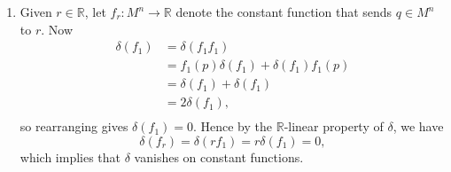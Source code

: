 \documentclass{article}
\begin{document}
\begin{enumerate}[label={\bf Q\arabic*:}]
\begin{enumerate}
      \item Given $r\in\mathbb{R}$, let $f_r:M^n\rightarrow\mathbb{R}$
        denote the constant function that sends $q\in M^n$ to $r$. Now
        \begin{align*}
          \delta(f_1) &=\delta(f_1f_1) \\
            &=f_1(p)\delta(f_1) +\delta(f_1)f_1(p) \\
            &=\delta(f_1) +\delta(f_1) \\
            &=2\delta(f_1), \\
        \end{align*}
        so rearranging gives $\delta(f_1)=0$. Hence by the
        $\mathbb{R}$-linear property of $\delta$, we have
        \[\delta(f_r) =\delta(rf_1) =r\delta(f_1)=0,\] which implies that
        $\delta$ vanishes on constant functions.
    \end{enumerate}
\end{enumerate}
\end{document}

